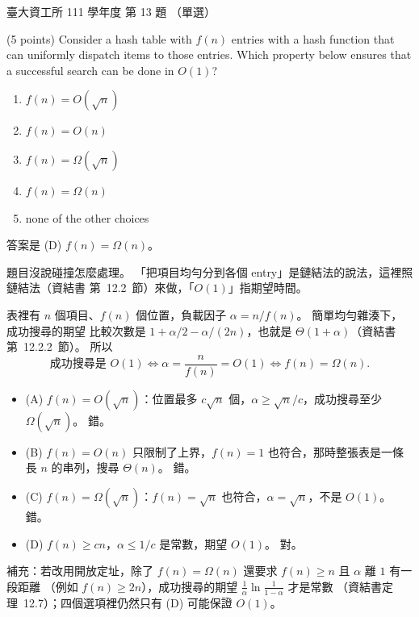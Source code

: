 \begin{pastexam}[label={px:ntu-111-dsaa-13}]{臺大資工所 111 學年度 第 13 題}
（單選）

(5 points) Consider a hash table with $f(n)$ entries with a hash function that can uniformly
dispatch items to those entries. Which property below ensures that a successful search can be
done in $O(1)$?
\begin{enumerate}[label=(\Alph*)]
\item $f(n)=O(\sqrt{n})$
\item $f(n)=O(n)$
\item $f(n)=\Omega(\sqrt{n})$
\item $f(n)=\Omega(n)$
\item none of the other choices
\end{enumerate}
\end{pastexam}

\begin{pastsoln}
答案是 (D) $f(n) = \Omega(n)$。

題目沒說碰撞怎麼處理。 「把項目均勻分到各個 entry」是鏈結法的說法，這裡照鏈結法（資結書
第~12.2~節）來做，「$O(1)$」指期望時間。

表裡有 $n$ 個項目、$f(n)$ 個位置，負載因子 $\alpha = n / f(n)$。 簡單均勻雜湊下，成功搜尋的期望
比較次數是 $1 + \alpha/2 - \alpha/(2n)$，也就是 $\Theta(1 + \alpha)$（資結書第~12.2.2~節）。 所以
\[
\text{成功搜尋是 } O(1) \iff \alpha = \frac{n}{f(n)} = O(1) \iff f(n) = \Omega(n).
\]
\begin{itemize}
\item (A) $f(n) = O(\sqrt{n})$：位置最多 $c\sqrt{n}$ 個，$\alpha \ge \sqrt{n}/c$，成功搜尋至少
$\Omega(\sqrt{n})$。 錯。
\item (B) $f(n) = O(n)$ 只限制了上界，$f(n) = 1$ 也符合，那時整張表是一條長 $n$ 的串列，搜尋
$\Theta(n)$。 錯。
\item (C) $f(n) = \Omega(\sqrt{n})$：$f(n) = \sqrt{n}$ 也符合，$\alpha = \sqrt{n}$，不是 $O(1)$。 錯。
\item (D) $f(n) \ge cn$，$\alpha \le 1/c$ 是常數，期望 $O(1)$。 對。
\end{itemize}

補充：若改用開放定址，除了 $f(n) = \Omega(n)$ 還要求 $f(n) \ge n$ 且 $\alpha$ 離 $1$ 有一段距離
（例如 $f(n) \ge 2n$），成功搜尋的期望 $\frac{1}{\alpha} \ln \frac{1}{1 - \alpha}$ 才是常數
（資結書定理~12.7）；四個選項裡仍然只有 (D) 可能保證 $O(1)$。
\end{pastsoln}

